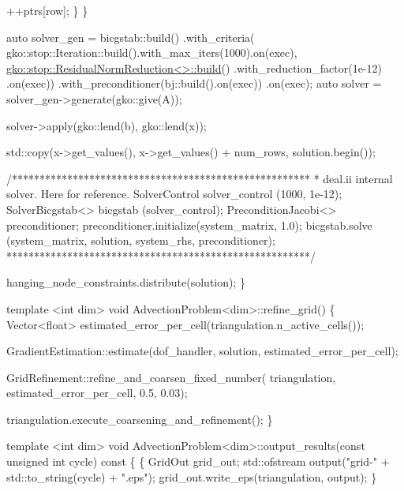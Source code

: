 \begin{DoxyCodeInclude}
            ++ptrs[row];
        \}
    \}

    \textcolor{keyword}{auto} solver\_gen =
        bicgstab::build()
            .with\_criteria(
                gko::stop::Iteration::build().with\_max\_iters(1000).on(exec),
                \hyperlink{classgko_1_1stop_1_1ResidualNormReduction}{gko::stop::ResidualNormReduction<>::build}()
                    .with\_reduction\_factor(1e-12)
                    .on(exec))
            .with\_preconditioner(bj::build().on(exec))
            .on(exec);
    \textcolor{keyword}{auto} solver = solver\_gen->generate(gko::give(A));

    solver->apply(gko::lend(b), gko::lend(x));

    std::copy(x->get\_values(), x->get\_values() + num\_rows, solution.begin());

    \textcolor{comment}{/******************************************************}
\textcolor{comment}{     * deal.ii internal solver. Here for reference.}
\textcolor{comment}{     SolverControl           solver\_control (1000, 1e-12);}
\textcolor{comment}{     SolverBicgstab<>        bicgstab (solver\_control);}
\textcolor{comment}{}
\textcolor{comment}{     PreconditionJacobi<> preconditioner;}
\textcolor{comment}{     preconditioner.initialize(system\_matrix, 1.0);}
\textcolor{comment}{}
\textcolor{comment}{     bicgstab.solve (system\_matrix, solution, system\_rhs,}
\textcolor{comment}{                     preconditioner);}
\textcolor{comment}{    *******************************************************/}

    hanging\_node\_constraints.distribute(solution);
\}


\textcolor{keyword}{template} <\textcolor{keywordtype}{int} dim>
\textcolor{keywordtype}{void} AdvectionProblem<dim>::refine\_grid()
\{
    Vector<float> estimated\_error\_per\_cell(triangulation.n\_active\_cells());

    GradientEstimation::estimate(dof\_handler, solution,
                                 estimated\_error\_per\_cell);

    GridRefinement::refine\_and\_coarsen\_fixed\_number(
        triangulation, estimated\_error\_per\_cell, 0.5, 0.03);

    triangulation.execute\_coarsening\_and\_refinement();
\}


\textcolor{keyword}{template} <\textcolor{keywordtype}{int} dim>
\textcolor{keywordtype}{void} AdvectionProblem<dim>::output\_results(\textcolor{keyword}{const} \textcolor{keywordtype}{unsigned} \textcolor{keywordtype}{int} cycle)\textcolor{keyword}{ const}
\textcolor{keyword}{}\{
    \{
        GridOut grid\_out;
        std::ofstream output(\textcolor{stringliteral}{"grid-"} + std::to\_string(cycle) + \textcolor{stringliteral}{".eps"});
        grid\_out.write\_eps(triangulation, output);
    \}


\end{DoxyCodeInclude}
